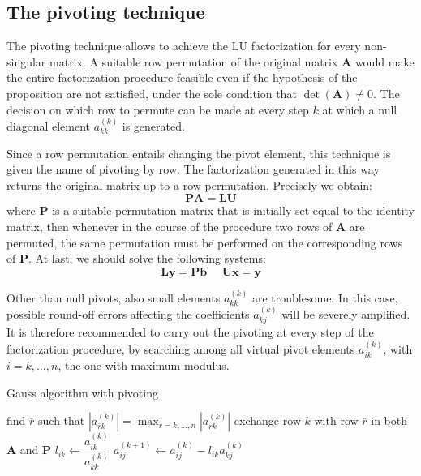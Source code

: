\documentclass[12pt, a4paper]{report}
\newtheorem[style=M,bodystyle=\normalfont]{theorem}{Theorem}
\newtheorem[style=M,bodystyle=\normalfont]{proposition}{Proposition}
\newtheorem[style=M,bodystyle=\normalfont]{corollary}{Corollary}
\newtheorem[style=M,bodystyle=\normalfont]{lemma}{Lemma}
\newtheorem[style=M,bodystyle=\normalfont]{definition}{Definition}
\begin{document}
    \subsection{The pivoting technique}
    The pivoting technique allows to achieve the LU factorization for every non-singular matrix. A suitable row permutation of the 
    original matrix $\boldsymbol{A}$ would make the entire factorization procedure feasible even if the hypothesis of the proposition
    are not satisfied, under the sole condition that $\det(\boldsymbol{A}) \neq 0$. The decision on which row to permute can be made 
    at every step $k$ at which a null diagonal element $a_{kk}^{(k)}$ is generated. 

    Since a row permutation entails changing the pivot element, this technique is given the name of pivoting by row. The factorization 
    generated in this way returns the original matrix up to a row permutation. Precisely we obtain: 
    \[\boldsymbol{PA}=\boldsymbol{LU}\]
    where $\boldsymbol{P}$ is a suitable permutation matrix that is initially set equal to the identity matrix, then whenever in the 
    course of the procedure two rows of $\boldsymbol{A}$ are permuted, the same permutation must be performed on the corresponding rows
    of $\boldsymbol{P}$. At last, we should solve the following systems: 
    \[\boldsymbol{Ly}=\boldsymbol{Pb} \:\:\:\:\:\: \boldsymbol{Ux}=\boldsymbol{y}\]

    Other than null pivots, also small elements $a_{kk}^{(k)}$ are troublesome. In this case, possible round-off errors affecting the 
    coefficients $a_{kj}^{(k)}$ will be severely amplified. It is therefore recommended to carry out the pivoting at every step of the
    factorization procedure, by searching among all virtual pivot elements $a_{ik}^{(k)}$, with $i=k,\dots,n$, the one with maximum 
    modulus. 
    \begin{algorithm}[H]
        \caption{Gauss algorithm with pivoting}
            \begin{algorithmic}[1]
                    \State find $\overline{r}$ such that $\left\lvert a_{\overline{r}k}^{(k)} \right\rvert=\max_{r=k,\dots,n}\left\lvert a_{rk}^{(k)} \right\rvert$
                    \State exchange row $k$ with row $\overline{r}$ in both $\boldsymbol{A}$ and $\boldsymbol{P}$
                        \State $l_{ik} \leftarrow \dfrac{a_{ik}^{(k)}}{a_{kk}^{(k)}}$
                            \State $a_{ij}^{(k+1)} \leftarrow a_{ij}^{(k)}-l_{ik}a_{kj}^{(k)}$
                        \EndFor
                    \EndFor
                \EndFor
            \end{algorithmic}
    \end{algorithm}
\end{document}
